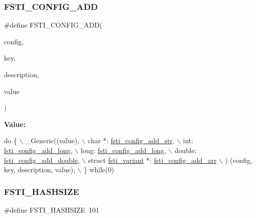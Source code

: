 \subsubsection{\texorpdfstring{F\+S\+T\+I\+\_\+\+C\+O\+N\+F\+I\+G\+\_\+\+A\+DD}{FSTI\_CONFIG\_ADD}}
{\footnotesize\ttfamily \#define F\+S\+T\+I\+\_\+\+C\+O\+N\+F\+I\+G\+\_\+\+A\+DD(\begin{DoxyParamCaption}\item[{}]{config,  }\item[{}]{key,  }\item[{}]{description,  }\item[{}]{value }\end{DoxyParamCaption})}

{\bfseries Value\+:}
\begin{DoxyCode}
\textcolor{keywordflow}{do} \{                                                        \(\backslash\)
        \_Generic((value),                   \(\backslash\)
                 \textcolor{keywordtype}{char} *: \mbox{\hyperlink{fsti-config_8h_a3ee06dfcfc2e683469ca7ed25f9dc7a4}{fsti\_config\_add\_str}},            \(\backslash\)
                 \textcolor{keywordtype}{int}: \mbox{\hyperlink{fsti-config_8h_aeeb0d90b0edb706662e123f6747b2a3c}{fsti\_config\_add\_long}},         \(\backslash\)
                 \textcolor{keywordtype}{long}: \mbox{\hyperlink{fsti-config_8h_aeeb0d90b0edb706662e123f6747b2a3c}{fsti\_config\_add\_long}},            \(\backslash\)
                 \textcolor{keywordtype}{double}: \mbox{\hyperlink{fsti-config_8h_ac687fc8ca6887aae337ce8ef4188f089}{fsti\_config\_add\_double}},                \(\backslash\)
                 \textcolor{keyword}{struct} \mbox{\hyperlink{structfsti__variant}{fsti\_variant}} *: \mbox{\hyperlink{fsti-config_8h_a5d0a69eb0415adc0b32d29a92c002890}{fsti\_config\_add\_arr}}     \(\backslash\)
            ) (config, key, description, value);        \(\backslash\)
    \} \textcolor{keywordflow}{while}(0)
\end{DoxyCode}
\mbox{\label{fsti-config_8h_a461de2e96a72548147bd4de3730af2a5}} 
\subsubsection{\texorpdfstring{F\+S\+T\+I\+\_\+\+H\+A\+S\+H\+S\+I\+ZE}{FSTI\_HASHSIZE}}
{\footnotesize\ttfamily \#define F\+S\+T\+I\+\_\+\+H\+A\+S\+H\+S\+I\+ZE~101}



